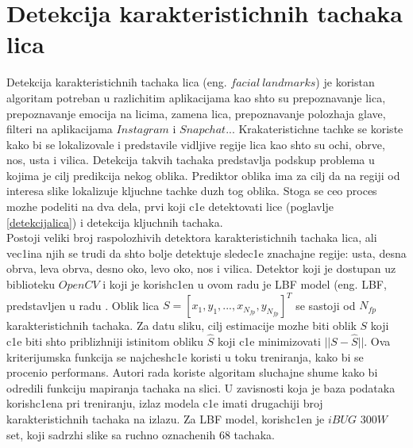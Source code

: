 \documentclass[a4paper, openany, oneside, 11pt]{book}
\begin{document}
\section{Detekcija karakteristichnih tachaka lica}
Detekcija karakteristichnih tachaka lica (eng. $facial\ landmarks$) je koristan algoritam potreban u razlichitim aplikacijama kao shto su prepoznavanje lica, prepoznavanje emocija na licima, zamena lica, prepoznavanje polozhaja glave, filteri na aplikacijama $Instagram$ i $Snapchat$... Krakateristichne tachke se koriste kako bi se lokalizovale i predstavile vidljive regije lica kao shto su ochi, obrve, nos, usta i vilica. Detekcija takvih tachaka predstavlja podskup problema u kojima je cilj predikcija nekog oblika. Prediktor oblika ima za cilj da na regiji od interesa slike lokalizuje kljuchne tachke duzh tog oblika. Stoga se ceo proces mozhe podeliti na dva dela, prvi koji c1e detektovati lice (poglavlje \ref{detekcijalica}) i detekcija kljuchnih tachaka.\\
Postoji veliki broj raspolozhivih detektora karakteristichnih tachaka lica, ali vec1ina njih se trudi da shto bolje detektuje sledec1e znachajne regije: usta, desna obrva, leva obrva, desno oko, levo oko, nos i vilica. Detektor koji je dostupan uz biblioteku $OpenCV$ i koji je korish\-c1en u ovom radu je \acrshort{LBF} model (eng. \acrlong{LBF}, predstavljen u radu \cite{LBF}. Oblik lica $S=[x_1, y_1,...,x_{N_{fp}},y_{N_{fp}}]^T$ se sastoji od $N_{fp}$ karakteristichnih tachaka. Za datu sliku, cilj estimacije mozhe biti oblik $S$ koji c1e biti shto priblizhniji istinitom obliku $\hat{S}$ koji c1e minimizovati $||S-\hat{S}||$. Ova kriterijumska funkcija se najchesh\-c1e koristi u toku treniranja, kako bi se procenio performans. Autori rada \cite{LBF} koriste algoritam sluchajne shume kako bi odredili funkciju mapiranja tachaka na slici.
U zavisnosti koja je baza podataka korish\-c1ena pri treniranju, izlaz modela c1e imati drugachiji broj karakteristichnih tachaka na izlazu. Za \acrshort{LBF} model, korish\-c1en je $iBUG$ $300W$ set, koji sadrzhi slike sa ruchno oznachenih 68 tachaka.
\end{document}
